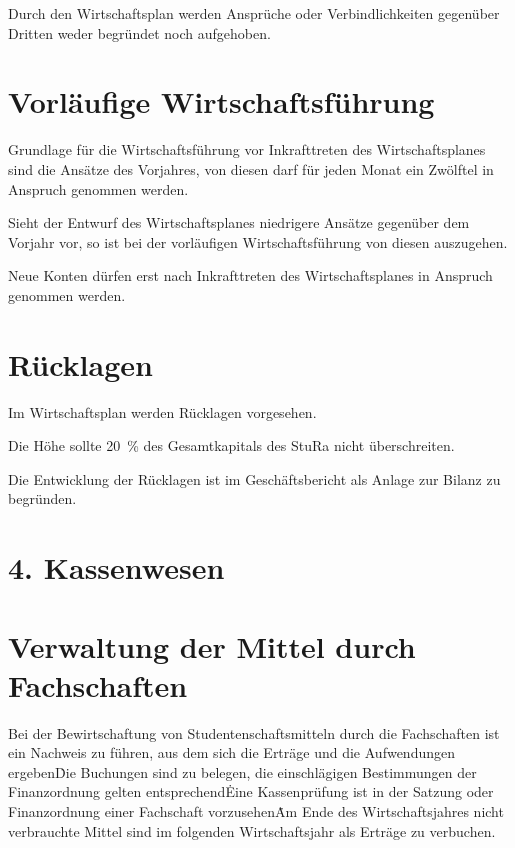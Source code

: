\Abs \Satz Durch den Wirtschaftsplan werden Ansprüche oder Verbindlichkeiten gegenüber Dritten weder begründet noch aufgehoben.



\section{Vorläufige Wirtschaftsführung}

\Abs \Satz Grundlage für die Wirtschaftsführung vor Inkrafttreten des Wirtschaftsplanes sind die Ansätze des Vorjahres, von diesen darf für jeden Monat ein Zwölftel in Anspruch genommen werden.

\Abs \Satz Sieht der Entwurf des Wirtschaftsplanes niedrigere Ansätze gegenüber dem Vorjahr vor, so ist bei der vorläufigen Wirtschaftsführung von diesen auszugehen.

\Abs \Satz Neue Konten dürfen erst nach Inkrafttreten des Wirtschaftsplanes in Anspruch genommen werden.



\section{Rücklagen}

\Abs \Satz Im Wirtschaftsplan werden Rücklagen vorgesehen.

\Abs \Satz Die Höhe sollte 20~\% des Gesamtkapitals des StuRa nicht überschreiten.

\Abs \Satz Die Entwicklung der Rücklagen ist im Geschäftsbericht als Anlage zur Bilanz zu begründen.


\section*{4. Kassenwesen}



\section{Verwaltung der Mittel durch Fachschaften}

\Abs \Satz Bei der Bewirtschaftung von Studentenschaftsmitteln durch die Fachschaften ist ein Nachweis zu führen, aus dem sich die Erträge und die Aufwendungen ergeben\. Die Buchungen sind zu belegen, die einschlägigen Bestimmungen der Finanzordnung gelten entsprechend\. Eine Kassenprüfung ist in der Satzung oder Finanzordnung einer Fachschaft vorzusehen\. Am Ende des Wirtschaftsjahres nicht verbrauchte Mittel sind im folgenden Wirtschaftsjahr als Erträge zu verbuchen.

